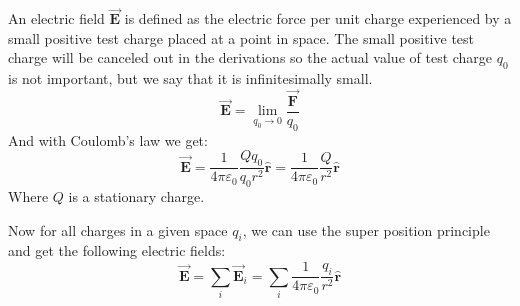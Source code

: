 An electric field $\vec{\boldsymbol{E}}$ is defined as the electric force per unit charge experienced by a small positive test charge placed at a point in space. The small positive test charge will be canceled out in the derivations so the actual value of test charge $q_0$ is not important, but we say that it is infinitesimally small.
\begin{equation*}
  \vec{\boldsymbol{E}} = \lim_{q_0\to0}\frac{\vec{\boldsymbol{F}}}{q_0}
\end{equation*}
And with Coulomb's law we get:
\begin{equation*}
  \vec{\boldsymbol{E}} = \frac{1}{4\pi\varepsilon_0}\frac{Qq_0}{q_0r^2}\hat{\boldsymbol{r}} 
  = \frac{1}{4\pi\varepsilon_0}\frac{Q}{r^2}\hat{\boldsymbol{r}} 
\end{equation*}
Where $Q$ is a stationary charge.

Now for all charges in a given space $q_i$, we can use the super position principle and get the following electric fields:
\begin{equation*}
  \vec{\boldsymbol{E}} = \sum_i\vec{\boldsymbol{E}}_i = \sum_i\frac{1}{4\pi\varepsilon_0}\frac{q_i}{r^2}\hat{\boldsymbol{r}} 
\end{equation*}


